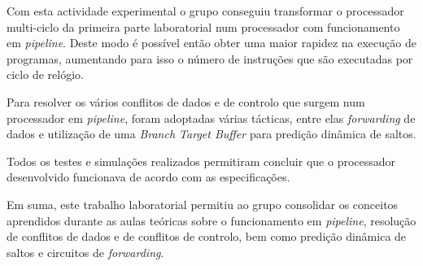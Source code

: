 \documentclass[a4paper]{article}
\begin{document}
	Com esta actividade experimental o grupo conseguiu transformar o processador multi-ciclo da primeira parte laboratorial num processador com funcionamento em \textit{pipeline}. Deste modo é possível então obter uma maior rapidez na execução de programas, aumentando para isso o número de instruções que são executadas por ciclo de relógio.
	
	Para resolver os vários conflitos de dados e de controlo que surgem num processador em \textit{pipeline}, foram adoptadas várias tácticas, entre elas \textit{forwarding} de dados e utilização de uma \textit{Branch Target Buffer} para predição dinâmica de saltos.
	
	 Todos os testes e simulações realizados permitiram concluir que o processador desenvolvido funcionava de acordo com as especificações.
	 
	  Em suma, este trabalho laboratorial permitiu ao grupo consolidar os conceitos aprendidos durante as aulas teóricas sobre o funcionamento em \textit{pipeline}, resolução de conflitos de dados e de conflitos de controlo, bem como predição dinâmica de saltos e circuitos de \textit{forwarding}.
\end{document}
